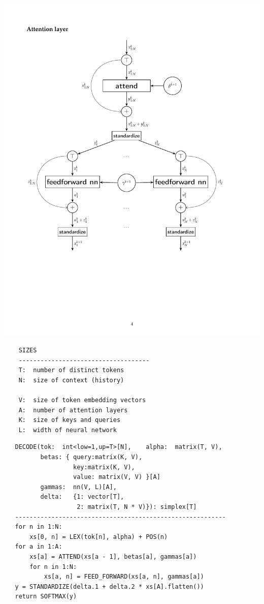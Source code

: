 \documentclass[9pt]{report}
\begin{document}
{
\begin{center}
\vspace*{-24pt}
\hfill\includegraphics[height=\textheight]{img/attention-diagram.pdf}
\end{center}

\clearpage
\renewcommand{\baselinestretch}{1.1}
\footnotesize
\begin{verbatim}
    SIZES
    ------------------------------------
    T:  number of distinct tokens
    N:  size of context (history)

    V:  size of token embedding vectors
    A:  number of attention layers
    K:  size of keys and queries
    L:  width of neural network
\end{verbatim}

\clearpage
\footnotesize 
\begin{verbatim}
   DECODE(tok:  int<low=1,up=T>[N],    alpha:  matrix(T, V),
          betas: { query:matrix(K, V),
                   key:matrix(K, V),
                   value: matrix(V, V) }[A]
          gammas:  nn(V, L)[A],
          delta:   {1: vector[T],
                    2: matrix(T, N * V)}): simplex[T]
   ----------------------------------------------------------
   for n in 1:N:
       xs[0, n] = LEX(tok[n], alpha) + POS(n)
   for a in 1:A:
       xs[a] = ATTEND(xs[a - 1], betas[a], gammas[a])
       for n in 1:N:
           xs[a, n] = FEED_FORWARD(xs[a, n], gammas[a])
   y = STANDARDIZE(delta.1 + delta.2 * xs[A].flatten())
   return SOFTMAX(y)
\end{verbatim}
\normalsize

}
\end{document}
